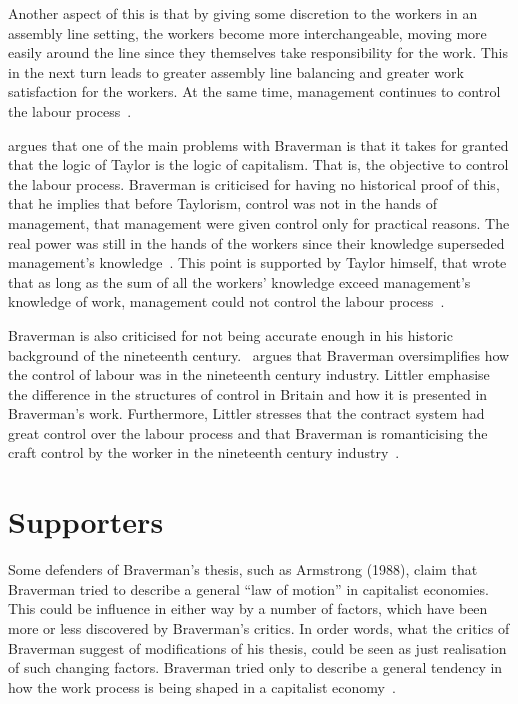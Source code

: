 \documentclass[a4paper,12pt,titlepage]{article}
\begin{document}
  Another aspect of this is that by giving some discretion to the workers
  in an assembly line setting, the workers become more interchangeable,
  moving more easily around the line since they themselves take
  responsibility for the work. This in the next turn leads to greater
  assembly line balancing and greater work satisfaction for the workers.
  At the same time, management continues to control the labour
  process~\cite[435]{ahdb}.

  \cite{sw} argues that one of the main problems with Braverman is
  that it takes for granted that the logic of Taylor is the logic of
  capitalism. That is, the objective to control the labour process.
  Braverman is criticised for having no historical proof of this,
  that he implies that before Taylorism, control was not in the
  hands of management, that management were given control only
  for practical reasons. The real power was still in the hands of
  the workers since their knowledge superseded management's
  knowledge~\cite[15]{sw}. This point is supported by Taylor himself,
  that wrote that as long as the sum of all the workers' knowledge exceed
  management's knowledge of work, management could not control
  the labour process~\cite[100]{hb}.

  Braverman is also criticised for not being accurate enough
  in his historic background of the nineteenth
  century.~\cite{cl} argues that Braverman oversimplifies how the
  control of labour was in the nineteenth century industry. Littler
  emphasise the difference in the structures of control in Britain
  and how it is presented in Braverman's work. Furthermore, Littler
  stresses that the contract system had great control over the
  labour process and that Braverman is romanticising the craft
  control by the worker in the nineteenth century
  industry~\cite[122-145]{cl}.

  \section{Supporters}
  Some defenders of Braverman's thesis, such as Armstrong (1988),
  claim that Braverman tried to describe a general ``law of motion''
  in capitalist economies. This could be influence in either way by
  a number of factors, which have been more or less discovered by
  Braverman's critics. In order words, what the critics of Braverman
  suggest of modifications of his thesis, could be seen as just realisation
  of such changing factors. Braverman tried only to describe a general
  tendency in how the work process is being shaped in a capitalist
  economy~\cite[156]{mnpb}.
\end{document}
